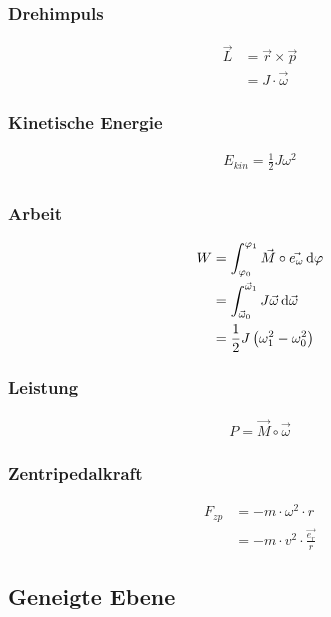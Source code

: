 \begin{multicols}{2}{}
\subsubsection{Drehimpuls}
\begin{align*}
\vec{L}&=\vec{r}\times\vec{p} \\
&=J\cdot \vec{\omega}
\end{align*}

\subsubsection{Kinetische Energie}
\begin{align*}
E_{kin}=\frac{1}{2}J\omega^2 \\
\end{align*}
\end{multicols}

\begin{multicols}{2}{}
\subsubsection{Arbeit}
\begin{align*}
W &=\int_{\varphi_0}^{\varphi_1}\vec{M}\circ\vec{e_\omega}\mathop{}\!\mathrm{d} \varphi \\
&=\int_{\vec{\omega}_0}^{\vec{\omega}_1}J\vec{\omega}\mathop{}\!\mathrm{d}\vec{\omega}\\
&=\frac{1}{2}J\left(\omega_1^2-\omega_0^2\right)
\end{align*}

\subsubsection{Leistung}
\begin{align*}
P=\vec{M}\circ\vec{\omega}
\end{align*}

\subsubsection{Zentripedalkraft}
\begin{align*}
F_{zp}&=-m\cdot\omega^2\cdot r\\
&=-m\cdot v^2\cdot \frac{\vec{e_r}}{r}
\end{align*}
\end{multicols}


\subsection{Geneigte Ebene}

